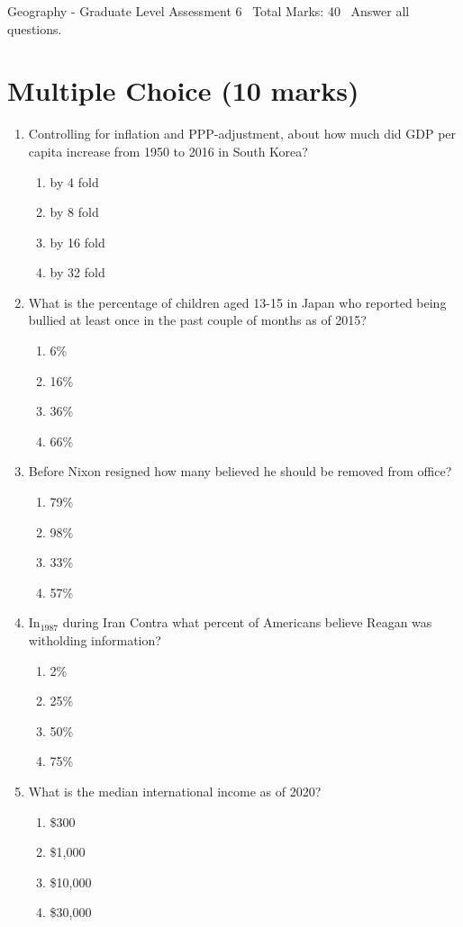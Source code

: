 \documentclass[12pt]{article}
\begin{document}
\begin{center}
Geography - Graduate Level Assessment 6 \
Total Marks: 40 \
Answer all questions.
\end{center}

\section*{Multiple Choice (10 marks)}
\begin{enumerate}[label=\arabic*.]
\item Controlling for inflation and PPP-adjustment, about how much did GDP per capita increase from 1950 to 2016 in South Korea?
\begin{enumerate}[label=(\alph*)]
    \item by 4 fold
    \item by 8 fold
    \item by 16 fold
    \item by 32 fold
\end{enumerate}
\item What is the percentage of children aged 13-15 in Japan who reported being bullied at least once in the past couple of months as of 2015?
\begin{enumerate}[label=(\alph*)]
    \item 6\%
    \item 16\%
    \item 36\%
    \item 66\%
\end{enumerate}
\item Before Nixon resigned how many believed he should be removed from office?
\begin{enumerate}[label=(\alph*)]
    \item 79\%
    \item 98\%
    \item 33\%
    \item 57\%
\end{enumerate}
\item In$_{1987}$ during Iran Contra what percent of Americans believe Reagan was witholding information?
\begin{enumerate}[label=(\alph*)]
    \item 2\%
    \item 25\%
    \item 50\%
    \item 75\%
\end{enumerate}
\item What is the median international income as of 2020?
\begin{enumerate}[label=(\alph*)]
    \item \$300
    \item \$1,000
    \item \$10,000
    \item \$30,000
\end{enumerate}
\end{enumerate}
\end{document}
